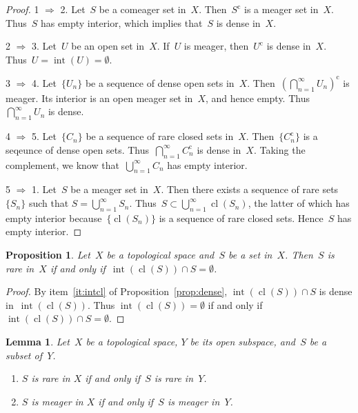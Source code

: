 \documentclass[11pt,a4paper]{article}
\newtheorem{lemma}{Lemma}[section]
\newtheorem{proposition}{Proposition}[section]
\theoremstyle{definition}
\newcommand{\co}{{\mathrm{c}}}
\DeclareMathOperator{\inter}{int}
\DeclareMathOperator{\cl}{cl}
\numberwithin{equation}{section}
\begin{document}
\begin{proof}
  1 $\Rightarrow$ 2. 
  Let~$S$ be a comeager set in~$X$. Then~$S^\co$ is a meager
  set in~$X$. Thus~$S$ has empty interior, which implies that~$S$ is dense in~$X$. 

  2 $\Rightarrow$ 3. 
  Let~$U$ be an open set in~$X$.
  If~$U$ is meager, then~$U^\co$ is dense in~$X$. Thus~$U=\!\inter(U) \!= \emptyset$.

  3 $\Rightarrow$ 4. 
  Let~$\{U_n\}$ be a sequence of dense open sets in~$X$. Then~$(\bigcap_{n=1}^\infty U_n)^\co$ is
  meager. Its interior is an open meager set in~$X$, and hence empty. Thus~$\bigcap_{n=1}^\infty
  U_n$  is dense. 

  4 $\Rightarrow$ 5. 
  Let~$\{C_n\}$ be a sequence of rare closed sets in~$X$. Then~$\{C_n^\co\}$ is a seqeunce
  of dense open sets. Thus~$\bigcap_{n=1}^\infty C_n^\co$ is dense in~$X$. Taking the complement, we
  know that~$\bigcup_{n=1}^\infty C_n$ has empty interior.   

  5 $\Rightarrow$ 1. 
  Let~$S$ be a meager set in~$X$. Then there exists a sequence of rare sets~$\{S_n\}$ such that 
  $S=\bigcup_{n=1}^\infty S_n$. Thus~$S\subset \bigcup_{n=1}^\infty \cl(S_n)$, the latter of which has
  empty interior because~$\{\cl(S_n)\}$ is a sequence of rare closed sets. 
  Hence~$S$ has empty interior. 
\end{proof}

\begin{proposition}
  \label{prop:intclr}
  Let~$X$ be a topological space and~$S$ be a set in~$X$. Then~$S$ is rare in~$X$ if and only
  if~$\inter(\cl(S)) \cap S = \emptyset$.
\end{proposition}

\begin{proof}
  By item~\ref{it:intcl} of Proposition~\ref{prop:dense}, $\inter(\cl(S)) \cap S$ is dense
  in~$\inter(\cl(S))$. Thus $\inter(\cl(S)) = \emptyset$ if and only if $\inter(\cl(S)) \cap S = \emptyset$.
\end{proof}

\begin{lemma}
  \label{lem:openb}
  Let~$X$ be a topological space, $Y$ be its open subspace, and~$S$ be a subset of~$Y$. 
  \begin{enumerate}
    \item \label{it:rare}$S$ is rare in $X$ if and only if~$S$ is rare in~$Y$.
    \item $S$ is meager in $X$ if and only if~$S$ is meager in~$Y$.
  \end{enumerate}
\end{lemma}
\end{document}
